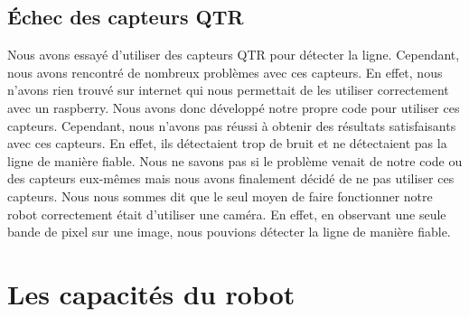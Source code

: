 \subsection{Échec des capteurs QTR}
Nous avons essayé d'utiliser des capteurs QTR pour détecter la ligne. Cependant, nous avons rencontré de nombreux problèmes avec ces capteurs. En effet, nous n'avons rien trouvé sur internet qui nous permettait de les utiliser correctement avec un raspberry.
Nous avons donc développé notre propre code pour utiliser ces capteurs. Cependant, nous n'avons pas réussi à obtenir des résultats satisfaisants avec ces capteurs. En effet, ils détectaient trop de bruit et ne détectaient pas la ligne de manière fiable.
Nous ne savons pas si le problème venait de notre code ou des capteurs eux-mêmes mais nous avons finalement décidé de ne pas utiliser ces capteurs.
Nous nous sommes dit que le seul moyen de faire fonctionner notre robot correctement était d'utiliser une caméra. En effet, en observant une seule bande de pixel sur une image, nous pouvions détecter la ligne de manière fiable.


\section{Les capacités du robot}